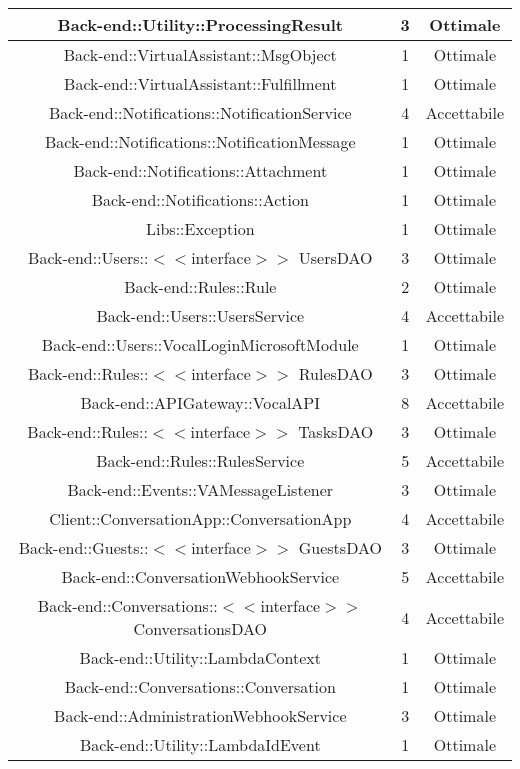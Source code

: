\begin{longtable}{|c|c|c|}
\hline Back-end::Utility::ProcessingResult & 3 & Ottimale \\
\hline Back-end::VirtualAssistant::MsgObject & 1 & Ottimale \\
\hline Back-end::VirtualAssistant::Fulfillment & 1 & Ottimale \\
\hline Back-end::Notifications::NotificationService & 4 & Accettabile \\
\hline Back-end::Notifications::NotificationMessage & 1 & Ottimale \\
\hline Back-end::Notifications::Attachment & 1 & Ottimale \\
\hline Back-end::Notifications::Action & 1 & Ottimale \\
\hline Libs::Exception & 1 & Ottimale \\
\hline Back-end::Users::$<$$<$interface$>$$>$ UsersDAO & 3 & Ottimale \\
\hline Back-end::Rules::Rule & 2 & Ottimale \\
\hline Back-end::Users::UsersService & 4 & Accettabile \\
\hline Back-end::Users::VocalLoginMicrosoftModule & 1 & Ottimale \\
\hline Back-end::Rules::$<$$<$interface$>$$>$ RulesDAO & 3 & Ottimale \\
\hline Back-end::APIGateway::VocalAPI & 8 & Accettabile \\
\hline Back-end::Rules::$<$$<$interface$>$$>$ TasksDAO & 3 & Ottimale \\
\hline Back-end::Rules::RulesService & 5 & Accettabile \\
\hline Back-end::Events::VAMessageListener & 3 & Ottimale \\
\hline Client::ConversationApp::ConversationApp & 4 & Accettabile \\
\hline Back-end::Guests::$<$$<$interface$>$$>$ GuestsDAO & 3 & Ottimale \\
\hline Back-end::ConversationWebhookService & 5 & Accettabile \\
\hline Back-end::Conversations::$<$$<$interface$>$$>$ ConversationsDAO & 4 & Accettabile \\
\hline Back-end::Utility::LambdaContext & 1 & Ottimale \\
\hline Back-end::Conversations::Conversation & 1 & Ottimale \\
\hline Back-end::AdministrationWebhookService & 3 & Ottimale \\
\hline Back-end::Utility::LambdaIdEvent & 1 & Ottimale \\

\end{longtable}
